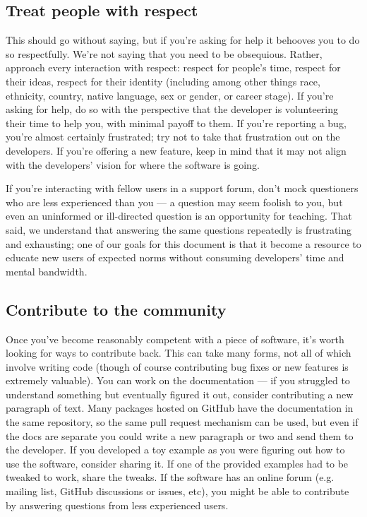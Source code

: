 \documentclass[9pt,training]{livecoms}
\begin{document}
\subsection{Treat people with respect}

This should go without saying, but if you're asking for help it behooves you to
do so respectfully. We're not saying that you need to be obsequious. Rather,
approach every interaction with respect: respect for people's time, respect for
their ideas, respect for their identity (including among other things race,
ethnicity, country, native language, sex or gender, or career stage). If you're
asking for help, do so with the perspective that the developer is volunteering
their time to help you, with minimal payoff to them.  If you're reporting a bug,
you're almost certainly frustrated; try not to take that frustration out on the
developers. If you're offering a new feature, keep in mind that it may not align
with the developers' vision for where the software is going.

If you're interacting with fellow users in a support forum, don't mock
questioners who are less experienced than you --- a question may seem foolish to
you, but even an uninformed or ill-directed question is an opportunity for
teaching. That said, we understand that answering the same questions repeatedly
is frustrating and exhausting; one of our goals for this document is that it
become a resource to educate new users of expected norms without consuming
developers' time and mental bandwidth.

\subsection{Contribute to the community}

Once you've become reasonably competent with a piece of software, it's worth
looking for ways to contribute back. This can take many forms, not all of which
involve writing code (though of course contributing bug fixes or new features is
extremely valuable). You can work on the documentation --- if you struggled to
understand something but eventually figured it out, consider contributing a new
paragraph of text. Many packages hosted on GitHub have the documentation in the
same repository, so the same pull request mechanism can be used, but even if the
docs are separate you could write a new paragraph or two and send them to the
developer. If you developed a toy example as you were figuring out how to use
the software, consider sharing it. If one of the provided examples had to be
tweaked to work, share the tweaks. If the software has an online forum (e.g.
mailing list, GitHub discussions or issues, etc), you might be able to
contribute by answering questions from less experienced users.
\end{document}
